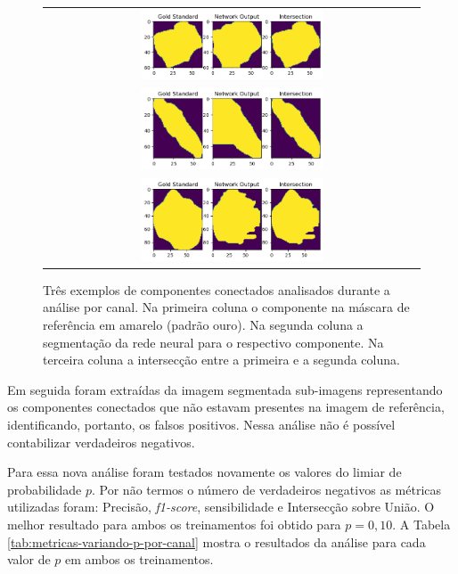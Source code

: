 \begin{figure}
    \centering
    
    \begin{tabular}{@{}c@{}}
        \includegraphics[width=0.5\textwidth]{figures/4_results/components/305_r10c7_component_1.png} \\
        \includegraphics[width=0.5\textwidth]{figures/4_results/components/305_r11c7_component_1.png} \\
        \includegraphics[width=0.5\textwidth]{figures/4_results/components/305_r12c11_component_1.png} 
    \end{tabular}

    \caption[Exemplos de componentes conectados obtidos pelo método proposto.]{Três exemplos de componentes conectados analisados durante a análise por canal. Na primeira coluna o componente na máscara de referência em amarelo (padrão ouro). Na segunda coluna a segmentação da rede neural para o respectivo componente. Na terceira coluna a intersecção entre a primeira e a segunda coluna.}
    \label{fig:intersection-net}
\end{figure}

Em seguida foram extraídas da imagem segmentada sub-imagens representando os componentes conectados que não estavam presentes na imagem de referência, identificando, portanto, os falsos positivos. Nessa análise não é possível contabilizar verdadeiros negativos. 


Para essa nova análise foram testados novamente os valores do limiar de probabilidade $p$. Por não termos o número de verdadeiros negativos as métricas utilizadas foram: Precisão, \textit{f1-score}, sensibilidade e Intersecção sobre União. O melhor resultado para ambos os treinamentos foi obtido para \(p = 0,10\). A Tabela \ref{tab:metricas-variando-p-por-canal} mostra o resultados da análise para cada valor de $p$ em ambos os treinamentos.

